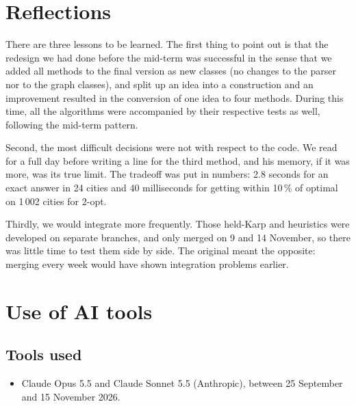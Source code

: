 \documentclass[10pt,a4paper]{article}
\makeatletter
\let\tsp@section\section
\renewcommand{\section}{\FloatBarrier\tsp@section}
\makeatother
\begin{document}
\section{Reflections}

There are three lessons to be learned. The first thing to point out is that the redesign we had done before the mid-term was successful in the sense that we added all methods to the final version as new classes (no changes to the parser nor to the graph classes), and split up an idea into a construction and an improvement resulted in the conversion of one idea to four methods. During this time, all the algorithms were accompanied by their respective tests as well, following the mid-term pattern.

Second, the most difficult decisions were not with respect to the code. We read for a full day before writing a line for the third method, and his memory, if it was more, was its true limit. The tradeoff was put in numbers: 2.8 seconds for an exact answer in 24 cities and 40 milliseconds for getting within 10\,\% of optimal on 1\,002 cities for 2-opt.

Thirdly, we would integrate more frequently. Those held-Karp and heuristics were developed on separate branches, and only merged on 9 and 14 November, so there was little time to test them side by side. The original meant the opposite: merging every week would have shown integration problems earlier.

\section{Use of AI tools}\label{sec-last}

\subsection*{Tools used}
\begin{itemize}
  \item Claude Opus 5.5 and Claude Sonnet 5.5 (Anthropic), between 25 September and 15 November 2026.
\end{itemize}
\end{document}

